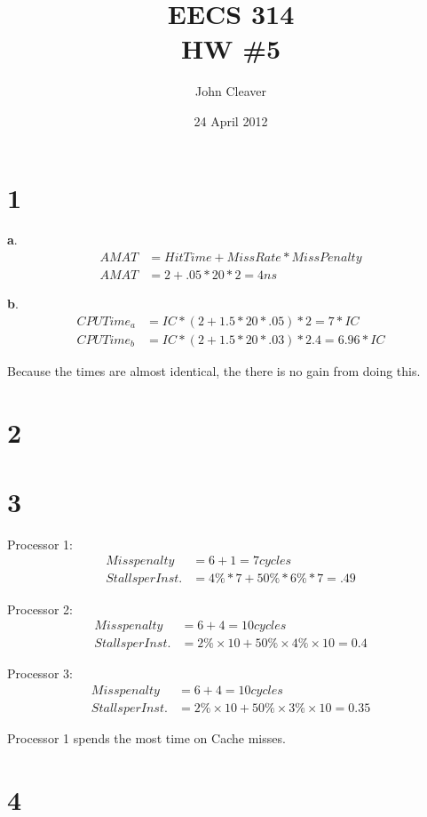 \documentclass{article}
\title{EECS 314 \\ HW \#5}
\author{John Cleaver}
\date{24 April 2012}
\begin{document}
\maketitle

\section*{1}

{\bf a}.
\begin{align*}
AMAT &= Hit Time + Miss Rate * Miss Penalty \\
AMAT &= 2 + .05 * 20 * 2 = 4 ns
\end{align*}

{\bf b}.
\begin{align*}
CPU Time_a &= IC * (2 + 1.5 * 20 * .05) * 2   = 7 * IC \\
CPU Time_b &= IC * (2 + 1.5 * 20 * .03) * 2.4 = 6.96 * IC
\end{align*}

Because the times are almost identical, the there is no gain from doing this.

\section*{2}

\section*{3} 

Processor 1:
\begin{align*}
Miss penalty &= 6 + 1 = 7 cycles \\
Stalls per Inst. &= 4\% * 7 + 50\% * 6\% * 7 =.49
\end{align*}

Processor 2:
\begin{align*}
Miss penalty &= 6 + 4 = 10 cycles \\
Stalls per Inst. &= 2\% × 10 + 50\% × 4\% × 10 = 0.4
\end{align*}

Processor 3:
\begin{align*}
Miss penalty &= 6 + 4 = 10 cycles \\
Stalls per Inst. &= 2\% × 10 + 50\% × 3\% × 10 = 0.35
\end{align*}

Processor 1 spends the most time on Cache misses.

\section*{4}
\end{document}
